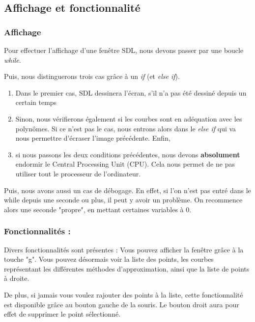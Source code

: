 \documentclass[letter]{article}
\begin{document}
\subsection{Affichage et fonctionnalité}
\label{sec:orga74c89e}

\subsubsection{Affichage}
\label{sec:orgb9b7f6e}

Pour effectuer l'affichage d'une fenêtre SDL, nous devons passer par une boucle \emph{while}.

Puis, nous distinguerons trois cas grâce à un \emph{if} (et \emph{else if}).

\begin{enumerate}
\item Dans le premier cas, SDL dessinera l'écran, s'il n'a pas été dessiné depuis un certain temps
\item Sinon, nous vérifierons également si les courbes sont en adéquation avec les polynômes. Si ce n'est pas le cas, nous entrons alors dans le \emph{else if} qui va nous permettre d'écraser l'image précédente. Enfin,
\item si nous passons les deux conditions précédentes, nous devons \textbf{absolument} endormir le Central Processing Unit (CPU). Cela nous permet de ne pas utiliser tout le processeur de l'ordinateur.
\end{enumerate}

Puis, nous avons aussi un cas de débogage. En effet, si l'on n'est pas entré dans le while depuis une seconde ou plus, il peut y avoir un problème. On recommence alors une seconde "propre", en mettant certaines variables à 0.








\subsubsection{Fonctionnalités :}
\label{sec:org1d5c4c5}

Divers fonctionnalités sont présentes :
Vous pouvez afficher la fenêtre grâce à la touche "g". Vous pouvez désormais voir la liste des points, les courbes représentant les différentes méthodes d'approximation, ainsi que la liste de points à droite.

De plus, si jamais vous voulez rajouter des points à la liste, cette fonctionnalité est disponible grâce au bouton gauche de la souris. Le bouton droit aura pour effet de supprimer le point sélectionné.
\end{document}
